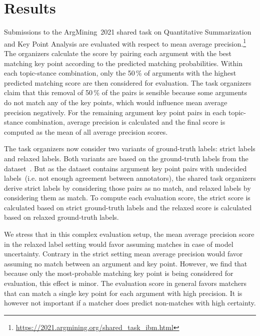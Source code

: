 \section{Results}\label{results}


Submissions to the ArgMining~2021 shared task on Quantitative Summarization and Key Point Analysis are evaluated with respect to mean average precision.\footnote{\url{https://2021.argmining.org/shared_task_ibm.html}}
The organizers calculate the score by pairing each argument with the best matching key point according to the predicted matching probabilities.
Within each topic-stance combination, only the 50\,\% of arguments with the highest predicted matching score are then considered for evaluation.
The task organizers claim that this removal of 50\,\% of the pairs is sensible because some arguments do not match any of the key points, which would influence mean average precision negatively. %
For the remaining argument key point pairs in each topic-stance combination, average precision is calculated and the final score is computed as the mean of all average precision scores.

The task organizers now consider two variants of ground-truth labels: strict labels and relaxed labels.
Both variants are based on the ground-truth labels from the \ArgKP dataset~\cite{Bar-HaimEFKLS2020}. But as the \ArgKP dataset contains argument key point pairs with undecided labels~(i.e. not enough agreement between annotators), the shared task organizers derive strict labels by considering those pairs as no match, and relaxed labels by considering them as match. %
To compute each evaluation score, the strict score is calculated based on strict ground-truth labels and the relaxed score is calculated based on relaxed ground-truth labels. %

We stress that in this complex evaluation setup, the mean average precision score in the relaxed label setting would favor assuming matches in case of model uncertainty.
Contrary in the strict setting mean average precision would favor assuming no match between an argument and key point.
However, we find that because only the most-probable matching key point is being considered for evaluation, this effect is minor.
The evaluation score in general favors matchers that can match a single key point for each argument with high precision.
It is however not important if a matcher does predict non-matches with high certainty.

